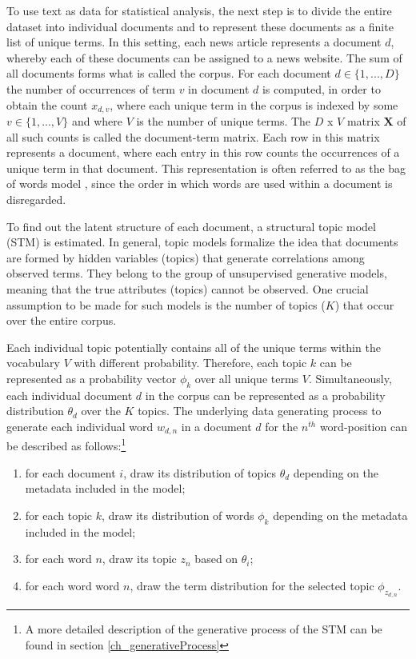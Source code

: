 \documentclass[12pt,a4paper,notitlepage]{article}
\begin{document}
To use text as data for statistical analysis, the next step is to divide the entire dataset into individual documents and to represent these documents as a finite list of unique terms. In this setting, each news article represents a document $d$, whereby each of these documents can be assigned to a news website. The sum of all documents forms what is called the corpus. For each document $d \in \lbrace 1,...,D \rbrace$ the number of occurrences of term $v$ in document $d$ is computed, in order to obtain the count $x_{d,v}$, where each unique term in the corpus is indexed by some $v \in \lbrace 1,...,V \rbrace$ and where $V$ is the number of unique terms. The $D$ x $V$ matrix $\boldsymbol{X}$ of all such counts is called the document-term matrix. Each row in this matrix represents a document, where each entry in this row counts the occurrences of a unique term in that document. This representation is often referred to as the bag of words model \citep{gentzkow_text_2017}, since the order in which words are used within a document is disregarded.

To find out the latent structure of each document, a structural topic model (STM) is estimated. In general, topic models formalize the idea that documents are formed by hidden variables (topics) that generate correlations among observed terms. They belong to the group of unsupervised generative models, meaning that the true attributes (topics) cannot be observed. One crucial assumption to be made for such models is the number of topics ($K$) that occur over the entire corpus. 

Each individual topic potentially contains all of the unique terms within the vocabulary $V$ with different probability. Therefore, each topic $k$ can be represented as a probability vector $\phi_k$ over all unique terms $V$. Simultaneously, each individual document $d$ in the corpus can be represented as a probability distribution $\theta_d$ over the $K$ topics. The underlying data generating process to generate each individual word $w_{d,n}$ in a document $d$ for the $n^{th}$ word-position can be described as follows:\footnote{A more detailed description of the generative process of the STM can be found in section \ref{ch_generativeProcess}}

\begin{enumerate}
	\item for each document $i$, draw its distribution of topics $\theta_d$ depending on the metadata included in the model; 
	\item for each topic $k$, draw its distribution of words $\phi_k$ depending on the metadata included in the model;
	\item for each word $n$, draw its topic $z_n$ based on $\theta_i$;
	\item for each word word $n$, draw the term distribution for the selected topic $\phi_{z_{d,n}}$.
\end{enumerate}
\end{document}
